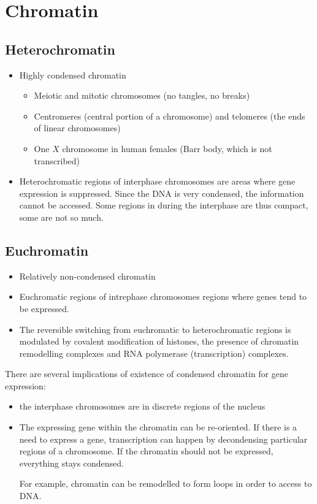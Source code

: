 \documentclass[11pt]{scrartcl}
\begin{document}
\section{Chromatin}

\subsection{Heterochromatin}
\begin{itemize}
\item Highly condensed chromatin

\begin{itemize}
\item Meiotic and mitotic chromosomes (no tangles, no breaks)
\item Centromeres (central portion of a chromosome) and telomeres (the
  ends of linear chromosomes)
\item One $X$ chromosome in human females (Barr body, which is
  not transcribed)
\end{itemize}
\item Heterochromatic regions of interphase chromosomes are areas
  where gene expression is suppressed. Since the DNΑ is very
  condensed, the information cannot be accessed. Some regions in
  during the interphase are thus compact, some are not so much.
\end{itemize}

\subsection{Euchromatin}
\begin{itemize}
\item Relatively non-condensed chromatin
\item Euchromatic regions of intrephase chromosomes regions where
  genes tend to be expressed.
\item The reversible switching from euchromatic to heterochromatic
  regions is modulated by covalent modification of histones, the
  presence of chromatin remodelling complexes and RNA polymerase
  (transcription) complexes.
\end{itemize}

There are several implications of existence of condensed chromatin for gene expression:

\begin{itemize}
\item the interphase chromosomes are in discrete regions of the nucleus
\item The expressing gene within the chromatin can be re-oriented. If
  there is a need to express a gene, transcription can happen by
  decondensing particular regions of a chromosome. If the chromatin
  should not be expressed, everything stays condensed.

  For example, chromatin can be remodelled to form loops in order to
  access to DNA.
\end{itemize}
\end{document}
